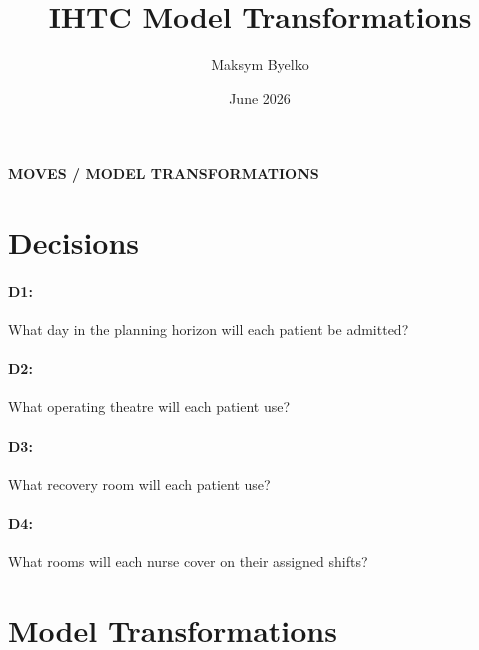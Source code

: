 \documentclass[10pt]{article}
\title{IHTC Model Transformations}
\author{Maksym Byelko}
\date{June 2026}
\newcommand{\mainsection}[1]{%
  \begin{center}
    \Large\bfseries #1
  \end{center}
  \vspace{6pt}
}
\begin{document}
\maketitle
\mainsection{MOVES / MODEL TRANSFORMATIONS}

\section*{Decisions}
\paragraph{D1:} What day in the planning horizon will each patient be admitted?
\paragraph{D2:} What operating theatre will each patient use?
\paragraph{D3:} What recovery room will each patient use?
\paragraph{D4:} What rooms will each nurse cover on their assigned shifts?

\section*{Model Transformations}
\end{document}
